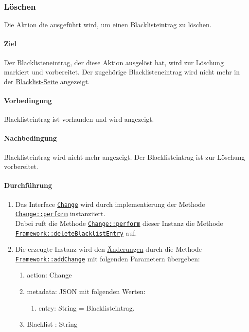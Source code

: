\subsubsection{Löschen}\label{AP_Aktionen_Blacklist_Loschen}

Die Aktion die ausgeführt wird, um einen Blacklisteintrag zu löschen.

\paragraph*{Ziel}
Der Blacklisteneintrag, der diese Aktion ausgelöst hat, wird zur Löschung markiert und vorbereitet.
Der zugehörige Blacklisteneintrag wird nicht mehr in der \hyperref[AP_Blacklist]{Blacklist-Seite} angezeigt.

\paragraph*{Vorbedingung}
Blacklisteintrag ist vorhanden und wird angezeigt.

\paragraph*{Nachbedingung}
Blacklisteintrag wird nicht mehr angezeigt. Der Blacklisteintrag ist zur Löschung vorbereitet.

\paragraph*{Durchführung}
\begin{enumerate}
    \item Das Interface \hyperref[AP_Change]{\texttt{Change}} wird durch implementierung der Methode \hyperref[AP_Change_perform]{\texttt{Change::perform}} instanziiert. \\
          Dabei ruft die Methode \hyperref[AP_Change_perform]{\texttt{Change::perform}} dieser Instanz die Methode \\
          \hyperref[AP_Framework_deleteBlacklistEntry]{\texttt{Framework::deleteBlacklistEntry}} auf.
    \item Die erzeugte Instanz wird den \hyperref[AP_Changes]{Änderungen} durch die Methode \hyperref[AP_Framework_addChange]{\texttt{Framework::addChange}} mit folgenden Parametern übergeben: \begin{enumerate}
        \item action: Change
        \item metadata: JSON mit folgenden Werten: \begin{enumerate}
            \item entry: String = Blacklisteintrag.
        \end{enumerate}
        \item \dq Blacklist \dq: String
    \end{enumerate}
\end{enumerate}
